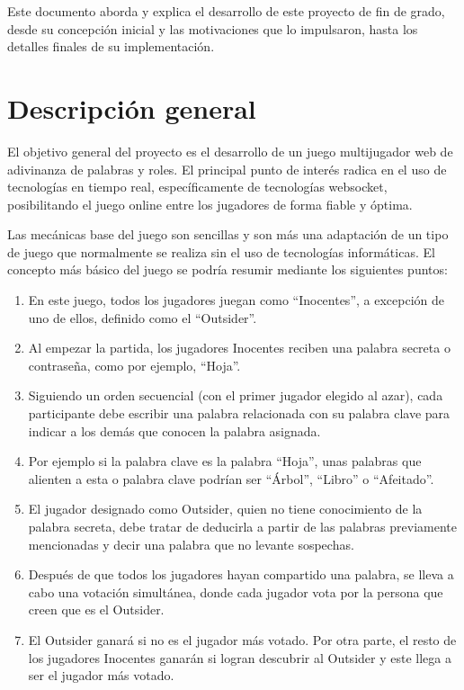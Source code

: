 Este documento aborda y explica el desarrollo de este proyecto de fin de grado,
desde su concepción inicial y las motivaciones que lo impulsaron, hasta los detalles
finales de su implementación.

\section{Descripción general}

El objetivo general del proyecto es el desarrollo de un juego multijugador web de adivinanza de palabras y roles. El principal punto de interés
radica en el uso de tecnologías en tiempo real, específicamente de tecnologías websocket, posibilitando el juego online entre los jugadores
de forma fiable y óptima.

Las mecánicas base del juego son sencillas y son más una adaptación de un tipo de juego que normalmente se realiza sin el uso de tecnologías informáticas.
El concepto más básico del juego se podría resumir mediante los siguientes puntos:

\begin{enumerate}
	\item En este juego, todos los jugadores juegan como ``Inocentes'', a excepción de uno de ellos,
	      definido como el ``Outsider''.
	\item Al empezar la partida, los jugadores
	      Inocentes reciben una
	      palabra secreta o contraseña, como por ejemplo, ``Hoja''.
	\item  Siguiendo un orden secuencial (con el primer jugador elegido al azar), cada
	      participante debe escribir una palabra relacionada con su palabra clave
	      para indicar a los demás que conocen la palabra asignada.
	\item Por ejemplo si la palabra clave es la palabra ``Hoja'', unas palabras que
	      alienten a esta  o palabra clave podrían ser ``Árbol'', ``Libro'' o ``Afeitado''.
	\item El jugador designado como Outsider, quien no tiene conocimiento de la palabra secreta, debe tratar de deducirla a partir de las palabras
	      previamente mencionadas y decir una palabra que no levante sospechas.
	\item Después de que todos los jugadores hayan compartido una palabra, se lleva a cabo una votación simultánea, donde cada jugador vota por la persona que creen
	      que es el Outsider.
	\item El Outsider ganará si no es el jugador más votado. Por otra parte, el resto de los jugadores Inocentes ganarán
	      si logran descubrir al Outsider y este llega a ser el jugador más votado.
\end{enumerate}

